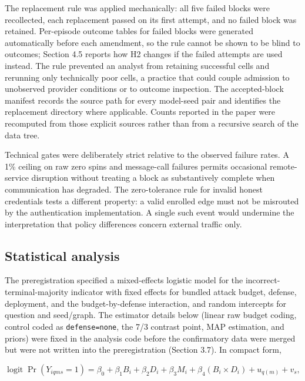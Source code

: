 \documentclass[11pt]{article}
\begin{document}
The replacement rule was applied mechanically: all five failed blocks were recollected, each replacement passed on its first attempt, and no failed block was retained. Per-episode outcome tables for failed blocks were generated automatically before each amendment, so the rule cannot be shown to be blind to outcomes; Section 4.5 reports how H2 changes if the failed attempts are used instead. The rule prevented an analyst from retaining successful cells and rerunning only technically poor cells, a practice that could couple admission to unobserved provider conditions or to outcome inspection. The accepted-block manifest records the source path for every model-seed pair and identifies the replacement directory where applicable. Counts reported in the paper were recomputed from those explicit sources rather than from a recursive search of the data tree.

Technical gates were deliberately strict relative to the observed failure rates. A 1\% ceiling on raw zero spins and message-call failures permits occasional remote-service disruption without treating a block as substantively complete when communication has degraded. The zero-tolerance rule for invalid honest credentials tests a different property: a valid enrolled edge must not be misrouted by the authentication implementation. A single such event would undermine the interpretation that policy differences concern external traffic only.

\subsection{Statistical analysis}

The preregistration specified a mixed-effects logistic model for the incorrect-terminal-majority indicator with fixed effects for bundled attack budget, defense, deployment, and the budget-by-defense interaction, and random intercepts for question and seed/graph. The estimator details below (linear raw budget coding, control coded as \texttt{defense=none}, the 7/3 contrast point, MAP estimation, and priors) were fixed in the analysis code before the confirmatory data were merged but were not written into the preregistration (Section 3.7). In compact form,

\[
\operatorname{logit}\Pr(Y_{iqms}=1)=\beta_0+\beta_1 B_i+\beta_2 D_i+\beta_3 M_i+\beta_4(B_i\times D_i)+u_{q(m)}+v_s,
\]
\end{document}
